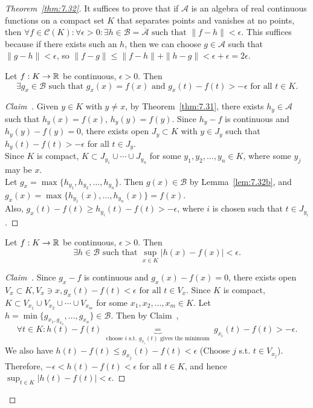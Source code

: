 \begin{proof}[Theorem~\ref{thm:7.32}]
	It suffices to prove that if $\mathscr{A}$ is an algebra of real continuous functions on a compact set $K$ that separates points and vanishes at no points, then $\forall{f \in \mathscr{C}(K)}:\forall{\epsilon > 0}: \exists{h \in \mathscr{B}=\overline{\mathscr{A}}} \text{ such that }  \|f-h\|<\epsilon$. This suffices because if there exists such an $h$, then we can choose $g \in \mathscr{A}$ such that $\|g-h\|<\epsilon$, so $\|f-g\|\le \|f-h\|+\|h-g\|<\epsilon+\epsilon=2\epsilon$.\\
	\begin{claim}[1]
		\label{clm:1}
		Let $f:K\to \mathbb{R}$ be continuous, $\epsilon>0$. Then \[
			\exists{g_x  \in \mathscr{B}} \text{ such that } g_{x}(x)=f(x) \text{ and } g_{x}(t)-f(t)>-\epsilon \text{ for all } t \in K
			.\]
	\end{claim}
	\begin{proof}[Claim~]
		Given $y \in K$ with $y\neq x$,  by Theorem~\ref{thm:7.31}, there exists $h_y \in \mathscr{A}$ such that $h_y(x)=f(x)$, $h_y(y)=f(y)$.
		Since $h_y -f$ is continuous and $h_y(y)-f(y)=0$, there exists open $J_y \subset K$ with $y \in J_y$ such that $h_y(t)-f(t)>-\epsilon$ for all $t \in J_y$.\\
		Since $K$ is compact, $K \subset J_{y_{1}} \cup \cdots \cup J_{y_{n}}$ for some $y_{1},y_{2}, \ldots ,y_{n} \in K$, where some $y_j$ may be $x$.\\
		Let $g_x=\max\{h_{y_{1}},h_{y_{2}}, \ldots , h_{y_n}\}$. Then $g(x) \in \mathscr{B}$ by Lemma~\ref{lem:7.32b}, and $g_x(x)=\max\{h_{y_{1}}(x), \ldots , h_{y_{n}}(x)\}=f(x)$.\\
		Also, $g_x(t)-f(t)\ge h_{y_i}(t)- f(t)>-\epsilon$, where $i$ is chosen such that $t \in J_{y_i}$.
	\end{proof}
	\begin{claim}[2]
		\label{clm:2}
		Let $f:K\to \mathbb{R}$ be continuous, $\epsilon>0$. Then \[
			\exists{h \in \mathscr{B}} \text{ such that }\sup_{x \in K}\left|h(x)-f(x)\right| <\epsilon
			.\]
	\end{claim}
	\begin{proof}[Claim~]
		Since $g_x -f$ is continuous and $g_x(x)-f(x)=0$, there exists open
		${V_x \subset K}, {V_x \ni x}, g_x(t)-f(t) < \epsilon \text{ for all }  t \in V_x $.
		Since $K$ is compact, $K \subset V_{x_{1}} \cup  V _{x_{2}} \cup \cdots \cup V_{x_{m}} $ for some $x_{1},x_{2},\ldots ,x_m \in K$.
		Let $h= \min\{g_{x_{1},g_{x_{2}}}, \ldots ,g_{x_{n}}\} \in \mathscr{B}$.
		Then by Claim~,
		\[
			\forall{t \in K}: h(t)-f(t)\underbrace{=}_{\text{ choose } i \text{ s.t. } g_{x_i}(t) \text{ gives the minimum }}g_{x_i}(t)-f(t)>-\epsilon
		.\]
		We also have $h(t)-f(t) \le g_{x_j}(t)-f(t)<\epsilon$ (Choose $j$ s.t. $t \in V_{x_j}$).
		Therefore, $-\epsilon<h(t)-f(t) <\epsilon$ for all $t \in K$, and hence $\sup_{t \in K}\left|h(t)-f(t)\right| < \epsilon$.
	\end{proof}
\end{proof}

